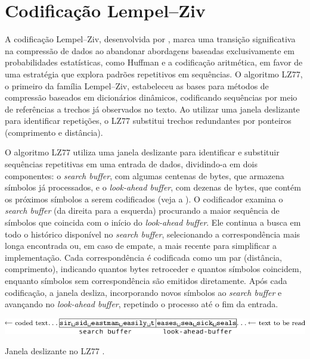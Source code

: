 \section{Codificação Lempel--Ziv}

A codificação Lempel--Ziv, desenvolvida por \textcite{ziv1977}, marca
uma transição significativa na compressão de dados ao abandonar abordagens
baseadas exclusivamente em probabilidades estatísticas, como Huffman e a
codificação aritmética, em favor de uma estratégia que explora padrões
repetitivos em sequências. O algoritmo LZ77, o primeiro da
família Lempel--Ziv, estabeleceu as bases para métodos de compressão baseados
em dicionários dinâmicos, codificando sequências por meio de referências a
trechos já observados no texto. Ao utilizar uma janela deslizante para
identificar repetições, o LZ77 substitui trechos redundantes por ponteiros
(comprimento e distância).

O algoritmo LZ77 utiliza uma janela deslizante para identificar e substituir
sequências repetitivas em uma entrada de dados, dividindo-a em dois
componentes: o \textit{search buffer}, com algumas centenas de bytes, que
armazena símbolos já processados, e o \textit{look-ahead buffer}, com dezenas
de bytes, que contém os próximos símbolos a serem codificados (veja a ). 
O codificador
examina o \textit{search buffer} (da direita para a esquerda) procurando a
maior sequência de símbolos que coincida com o início do \textit{look-ahead
buffer}. Ele continua a busca em todo o histórico disponível no \textit{search
buffer}, selecionando a correspondência mais longa encontrada ou, em caso de
empate, a mais recente para simplificar a implementação. Cada correspondência é
codificada como um par (distância, comprimento), indicando quantos bytes
retroceder e quantos símbolos coincidem, enquanto símbolos sem correspondência
são emitidos diretamente. Após cada codificação, a janela desliza, incorporando
novos símbolos ao \textit{search buffer} e avançando no \textit{look-ahead
buffer}, repetindo o processo até o fim da entrada.

\begin{marginfigure}%
  \includegraphics[width=\linewidth]{figures/sliding_window_lz77.png}
  \caption{Janela deslizante no LZ77 \parencite{salomon2007}.}\label{fig:sliding_window_lz77}
\end{marginfigure}

